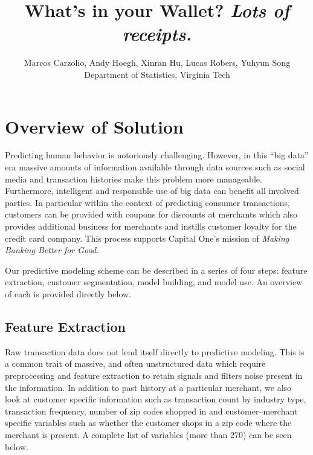 \documentclass[12pt]{article} %
\begin{document}
\def\spacingset#1{\renewcommand{\baselinestretch}%
{#1}\small\normalsize} \spacingset{1}
\newcommand{\ac}[1]{[{\color{red}\ Andy Says: {\tt #1}}]}
\newcommand{\xc}[1]{[{\color{red}\ Xinran Says: {\tt #1}}]}
\newcommand{\lc}[1]{[{\color{red}\ Lucas Says: {\tt #1}}]}
\newcommand{\mc}[1]{[{\color{red}\ Marcos Says: {\tt #1}}]}
\newcommand{\yc}[1]{[{\color{red}\ Yuhyun Says: {\tt #1}}]}







  \title{\bf What's in your Wallet? \emph{ Lots of receipts.}}
  \author{Marcos Carzolio, Andy Hoegh, Xinran Hu, Lucas Robers, Yuhyun Song\\ Department of Statistics, Virginia Tech}
 \maketitle
\bigskip
\begin{abstract}
\noindent
\ac{Fill this in}
\end{abstract}


\newpage


\section{Overview of Solution} 
Predicting human behavior is notoriously challenging.  However, in this ``big data'' era massive amounts of information available through data sources such as social media and transaction histories make this problem more manageable.  Furthermore, intelligent and responsible use of big data can benefit all involved parties.  In particular within the context of predicting consumer transactions, customers can be provided with coupons for discounts at merchants which also provides additional business for merchants and instills customer loyalty for the credit card company.  This process supports Capital One's mission of \emph{Making Banking Better for Good}.  

Our predictive modeling scheme can be described in a series of four steps: feature extraction, customer segmentation, model building, and model use.  An overview of each is provided directly below.
\subsection*{Feature Extraction} 
Raw transaction data does not lend itself directly to predictive modeling.  This is a common trait of massive, and often unstructured data which require preprocessing and feature extraction to retain signals and filters noise present in the information.  In addition to past history at a particular merchant, we also look at customer specific information such as transaction count by industry type, transaction frequency, number of zip codes shopped in and customer--merchant specific variables such as whether the customer shops in a zip code where the merchant is present.  A complete list of variables (more than 270) can be seen below.  
\end{document}
